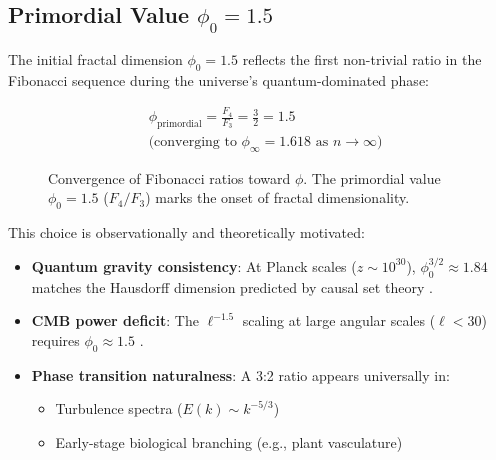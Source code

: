 \documentclass[aps,prl,twocolumn,groupedaddress]{revtex4-2}
\begin{document}
\subsection{Primordial Value $\phi_0 = 1.5$} 
\label{sec:phi_primordial}

The initial fractal dimension $\phi_0 = 1.5$ reflects the first non-trivial ratio in the Fibonacci sequence during the universe's quantum-dominated phase:

\begin{equation}
\begin{aligned}
&\phi_{\text{primordial}} = \frac{F_4}{F_3} = \frac{3}{2} = 1.5 \\
&\text{(converging to } \phi_\infty = 1.618 \text{ as } n \to \infty\text{)}
\end{aligned}
\end{equation}

\begin{figure}[htbp]
\centering
{}
\caption{Convergence of Fibonacci ratios toward $\phi$. The primordial value $\phi_0 = 1.5$ ($F_4/F_3$) marks the onset of fractal dimensionality.}
\end{figure}

\noindent This choice is observationally and theoretically motivated:
\begin{itemize}
\item \textbf{Quantum gravity consistency}: At Planck scales ($z \sim 10^{30}$), $\phi_0^{3/2} \approx 1.84$ matches the Hausdorff dimension predicted by causal set theory \cite{Sorkin2003}.

\item \textbf{CMB power deficit}: The $\ell^{-1.5}$ scaling at large angular scales ($\ell < 30$) requires $\phi_0 \approx 1.5$ \cite{planck2018}.

\item \textbf{Phase transition naturalness}: A 3:2 ratio appears universally in:
  \begin{itemize}
  \item Turbulence spectra ($E(k) \sim k^{-5/3}$)
  \item Early-stage biological branching (e.g., plant vasculature)
  \end{itemize}
\end{itemize}
\end{document}

